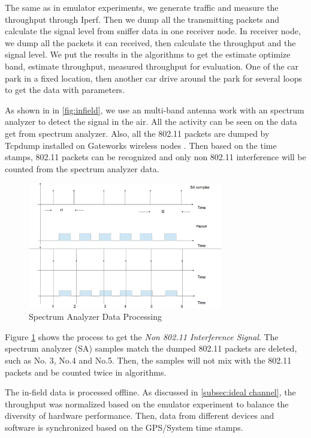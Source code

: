 The same as in emulator experiments, we generate traffic and measure the throughput through Iperf. Then we dump all the transmitting packets and calculate the signal level from sniffer data in one receiver node. 
In receiver node, we dump all the packets it can received, then calculate the throughput and the signal level. We put the results in the algorithms to get the estimate optimize band, estimate throughput, measured throughput for evaluation.
One of the car park in a fixed location, then another car drive around the park for several loops to get the data with parameters. 

As shown in in \ref{fig:infield}, we use an multi-band antenna work with an spectrum analyzer to detect the signal in the air. All the activity can be seen on the data get from spectrum analyzer.
Also, all the 802.11 packets are dumped by Tcpdump installed on Gateworks wireless nodes \cite{jacobson1989tcpdump}. Then based on the time stamps, 802.11 packets can be recognized and only non 802.11 interference will be counted from the spectrum analyzer data.  

\begin{figure}
\centering
\includegraphics[width=85mm]{figure/sa_process}
\caption{Spectrum Analyzer Data Processing}
\label{fig:sa_process}
\end{figure}

Figure \ref{fig:sa_process} shows the process to get the \emph{Non 802.11 Interference Signal}. The spectrum analyzer (SA) samples match the dumped 802.11 packets are deleted, such as No. 3, No.4 and No.5. Then, the samples will not mix with the 802.11 packets and be counted twice in algorithms.


The in-field data is processed offline. As discussed in \ref{subsec:ideal channel}, the throughput was normalized based on the emulator experiment to balance the diversity of hardware performance. Then, data from different devices and software is synchronized based on the GPS/System time stamps.


